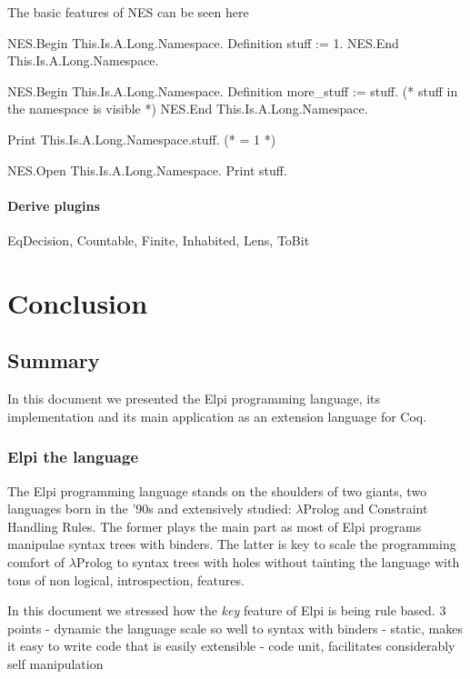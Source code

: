 \documentclass[a4paper, 11pt]{book}
\begin{document}
The basic features of NES can be seen here

\begin{coqcode}
NES.Begin This.Is.A.Long.Namespace.
  Definition stuff := 1.
NES.End This.Is.A.Long.Namespace.

NES.Begin This.Is.A.Long.Namespace.
  Definition more_stuff := stuff. (* stuff in the namespace is visible *)
NES.End This.Is.A.Long.Namespace.

Print This.Is.A.Long.Namespace.stuff. (* = 1 *)

NES.Open This.Is.A.Long.Namespace.
Print stuff.
\end{coqcode}

\subsubsection{Derive plugins}

EqDecision, Countable, Finite, Inhabited, Lens, ToBit

\chapter{Conclusion}

\section{Summary}

In this document we presented the Elpi programming language, its implementation
and its main application as an extension language for Coq.

\subsection{Elpi the language}

The Elpi programming language stands on the shoulders of two giants, two
languages born in the '90s and extensively studied: $\lambda$Prolog and
Constraint Handling Rules. The former plays the main part as most of
Elpi programs manipulae syntax trees with binders. The latter is key to
scale the programming comfort of $\lambda$Prolog to syntax trees with holes
without tainting the language with tons of non logical, introspection, features.

In this document we stressed how the \emph{key} feature of Elpi is being rule
based. 3 points
- dynamic the language scale so well to syntax with binders
- static, makes it easy to write code that is easily extensible
- code unit, facilitates considerably self manipulation
\end{document}
